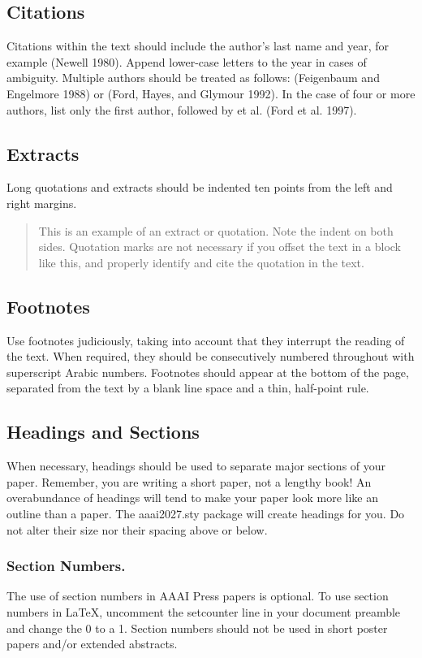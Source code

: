 \subsection{Citations}
Citations within the text should include the author's last name and year, for example (Newell 1980). Append lower-case letters to the year in cases of ambiguity. Multiple authors should be treated as follows: (Feigenbaum and Engelmore 1988) or (Ford, Hayes, and Glymour 1992). In the case of four or more authors, list only the first author, followed by et al. (Ford et al. 1997).

\subsection{Extracts}
Long quotations and extracts should be indented ten points from the left and right margins.

\begin{quote}
This is an example of an extract or quotation. Note the indent on both sides. Quotation marks are not necessary if you offset the text in a block like this, and properly identify and cite the quotation in the text.

\end{quote}

\subsection{Footnotes}
Use footnotes judiciously, taking into account that they interrupt the reading of the text. When required, they should be consecutively numbered throughout with superscript Arabic numbers. Footnotes should appear at the bottom of the page, separated from the text by a blank line space and a thin, half-point rule.

\subsection{Headings and Sections}
When necessary, headings should be used to separate major sections of your paper. Remember, you are writing a short paper, not a lengthy book! An overabundance of headings will tend to make your paper look more like an outline than a paper. The aaai2027.sty package will create headings for you. Do not alter their size nor their spacing above or below.

\subsubsection{Section Numbers.}
The use of section numbers in AAAI Press papers is optional. To use section numbers in \LaTeX{}, uncomment the setcounter line in your document preamble and change the 0 to a 1. Section numbers should not be used in short poster papers and/or extended abstracts.

